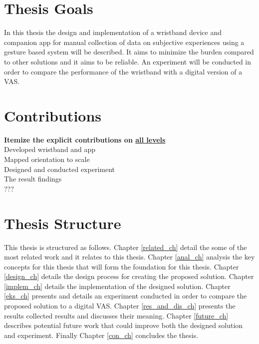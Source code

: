 \section{Thesis Goals}
In this thesis the design and implementation of a wristband device and companion app for manual collection of data on subjective experiences using a gesture based system will be described. It aims to minimize the burden compared to other solutions and it aims to be reliable. An experiment will be conducted in order to compare the performance of the wristband with a digital version of a VAS.

\section{Contributions}
\textbf{Itemize the explicit contributions on \underline{all levels}}\\
Developed wristband and app\\
Mapped orientation to scale\\
Designed and conducted experiment\\
The result findings\\
???\\


\section{Thesis Structure}
This thesis is structured as follows. Chapter \ref{related_ch} detail the some of the most related work and it relates to this thesis. Chapter \ref{anal_ch} analysis the key concepts for this thesis that will form the foundation for this thesis. Chapter \ref{design_ch} details the design process for creating the proposed solution. Chapter \ref{implem_ch} details the implementation of the designed solution. Chapter \ref{eks_ch} presents and details an experiment conducted in order to compare the proposed solution to a digital VAS. Chapter \ref{res_and_dis_ch} presents the results collected results and discusses their meaning. Chapter \ref{future_ch} describes potential future work that could improve both the designed solution and experiment. Finally Chapter \ref{con_ch} concludes the thesis.




